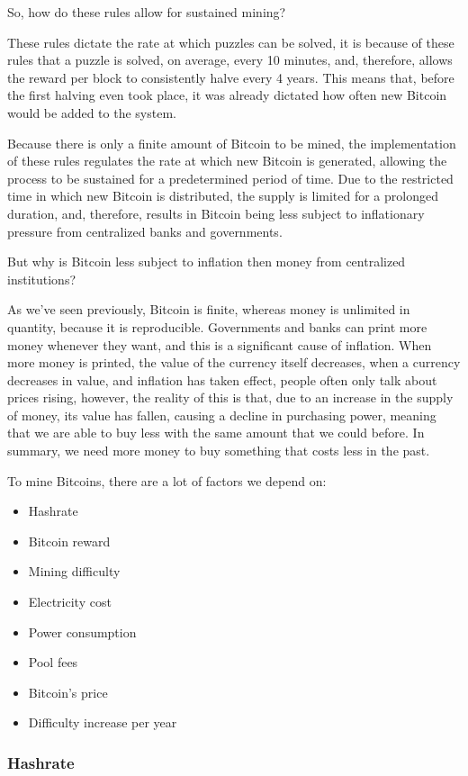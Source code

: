 \documentclass{article}
\begin{document}
So, how do these rules allow for sustained mining? 

These rules dictate the rate at which puzzles can be solved, it is because of these rules that a puzzle is solved, on average, every 10 minutes, and, therefore, allows the reward per block to consistently halve every 4 years. This means that, before the first halving even took place, it was already dictated how often new Bitcoin would be added to the system.

Because there is only a finite amount of Bitcoin to be mined, the implementation of these rules regulates the rate at which new Bitcoin is generated, allowing the process to be sustained for a predetermined period of time. Due to the restricted time in which new Bitcoin is distributed, the supply is limited for a prolonged duration, and, therefore, results in Bitcoin being less subject to inflationary pressure from centralized banks and governments. 

But why is Bitcoin less subject to inflation then money from centralized institutions?

As we've seen previously, Bitcoin is finite, whereas money is unlimited in quantity, because it is reproducible. Governments and banks can print more money whenever they want, and this is a significant cause of inflation. When more money is printed, the value of the currency itself decreases, when a currency decreases in value, and inflation has taken effect, people often only talk about prices rising, however, the reality of this is that, due to an increase in the supply of money, its value has fallen, causing a decline in purchasing power, meaning that we are able to buy less with the same amount that we could before.
In summary, we need more money to buy something that costs less in the past.

To mine Bitcoins, there are a lot of factors we depend on:
\begin{itemize}
 \item Hashrate
 \item Bitcoin reward
 \item Mining difficulty
 \item Electricity cost
 \item Power consumption
 \item Pool fees
 \item Bitcoin's price
 \item Difficulty increase per year
\end{itemize}

\subsubsection{Hashrate}
\end{document}
